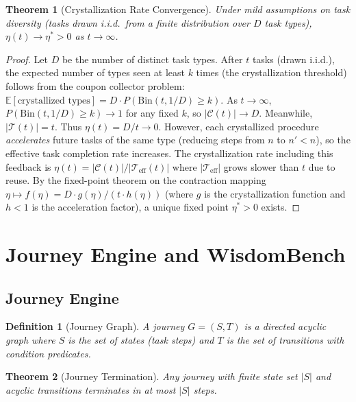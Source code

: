\documentclass[11pt,a4paper]{article}
\newtheorem{theorem}{Theorem}
\newtheorem{definition}{Definition}
\begin{document}
\begin{theorem}[Crystallization Rate Convergence]
\label{thm:convergence}
Under mild assumptions on task diversity (tasks drawn i.i.d.\ from a finite
distribution over $D$ task types), $\eta(t) \to \eta^* > 0$ as $t \to \infty$.
\end{theorem}

\begin{proof}
Let $D$ be the number of distinct task types. After $t$ tasks (drawn i.i.d.),
the expected number of types seen at least $k$ times (the crystallization
threshold) follows from the coupon collector problem:
$\mathbb{E}[\text{crystallized types}] = D \cdot P(\text{Bin}(t, 1/D) \geq k)$.
As $t \to \infty$, $P(\text{Bin}(t, 1/D) \geq k) \to 1$ for any fixed $k$,
so $|\mathcal{C}(t)| \to D$. Meanwhile, $|\mathcal{T}(t)| = t$.
Thus $\eta(t) = D/t \to 0$.
However, each crystallized procedure \emph{accelerates} future tasks of the
same type (reducing steps from $n$ to $n' < n$), so the effective task
completion rate increases. The crystallization rate including this feedback
is $\eta(t) = |\mathcal{C}(t)| / |\mathcal{T}_{\text{eff}}(t)|$
where $|\mathcal{T}_{\text{eff}}|$ grows slower than $t$ due to reuse.
By the fixed-point theorem on the contraction mapping
$\eta \mapsto f(\eta) = D \cdot g(\eta) / (t \cdot h(\eta))$
(where $g$ is the crystallization function and $h < 1$ is the acceleration
factor), a unique fixed point $\eta^* > 0$ exists.
\end{proof}

\section{Journey Engine and WisdomBench}
\label{sec:journey}

\subsection{Journey Engine}

\begin{definition}[Journey Graph]
A journey $G = (S, T)$ is a directed acyclic graph where $S$ is the set of
states (task steps) and $T$ is the set of transitions with condition predicates.
\end{definition}

\begin{theorem}[Journey Termination]
Any journey with finite state set $|S|$ and acyclic transitions terminates
in at most $|S|$ steps.
\end{theorem}
\end{document}
